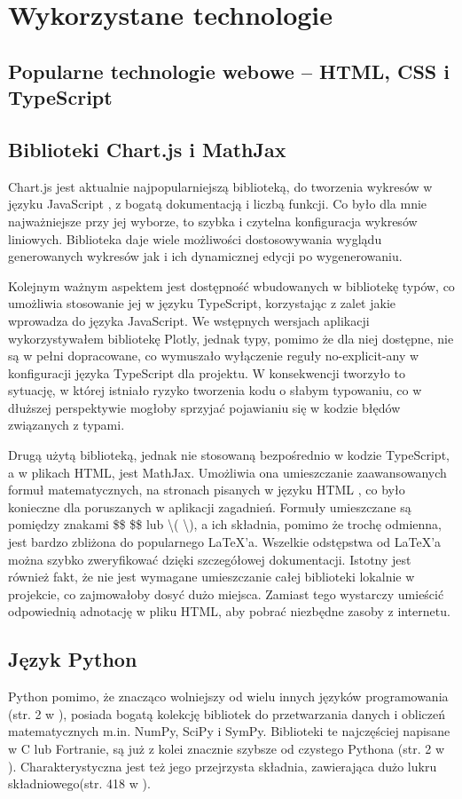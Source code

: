 \documentclass{SGGW-thesis}
\begin{document}
	
\chapter{Wykorzystane technologie}
	\section{Popularne technologie webowe -- HTML, CSS i TypeScript}
	
	\section{Biblioteki Chart.js i MathJax}
	Chart.js jest aktualnie najpopularniejszą biblioteką, do tworzenia wykresów w języku JavaScript \cite{chartjs}, z bogatą dokumentacją i liczbą funkcji. Co było dla mnie najważniejsze przy jej wyborze, to szybka i czytelna konfiguracja wykresów liniowych. Biblioteka daje wiele możliwości dostosowywania wyglądu generowanych wykresów jak i ich dynamicznej edycji po wygenerowaniu.
	
	Kolejnym ważnym aspektem jest dostępność wbudowanych w bibliotekę typów, co umożliwia stosowanie jej w języku TypeScript, korzystając z zalet jakie wprowadza do języka JavaScript. We wstępnych wersjach aplikacji wykorzystywałem bibliotekę Plotly, jednak typy, pomimo że dla niej dostępne, nie są w pełni dopracowane, co wymuszało wyłączenie reguły no-explicit-any w konfiguracji języka TypeScript dla projektu. W konsekwencji tworzyło to sytuację, w której istniało ryzyko tworzenia kodu o słabym typowaniu, co w dłuższej perspektywie mogłoby sprzyjać pojawianiu się w kodzie błędów związanych z typami.
	
	Drugą użytą biblioteką, jednak nie stosowaną bezpośrednio w kodzie TypeScript, a w plikach HTML, jest MathJax. Umożliwia ona umieszczanie zaawansowanych formuł matematycznych, na stronach pisanych w języku HTML \cite{mathjax}, co było konieczne dla poruszanych w aplikacji zagadnień. Formuły umieszczane są pomiędzy znakami \$\$ \$\$ lub \textbackslash( \textbackslash), a ich składnia, pomimo że trochę odmienna, jest bardzo zbliżona do popularnego LaTeX'a. Wszelkie odstępstwa od LaTeX'a można szybko zweryfikować dzięki szczegółowej dokumentacji. Istotny jest również fakt, że nie jest wymagane umieszczanie całej biblioteki lokalnie w projekcie, co zajmowałoby dosyć dużo miejsca. Zamiast tego wystarczy umieścić odpowiednią adnotację w pliku HTML, aby pobrać niezbędne zasoby z internetu.
	
	\section{Język Python}
	Python pomimo, że znacząco wolniejszy od wielu innych języków programowania (str. 2 w  \cite{Python}), posiada bogatą kolekcję bibliotek do przetwarzania danych i obliczeń matematycznych m.in. NumPy, SciPy i SymPy. Biblioteki te najczęściej napisane w C lub Fortranie, są już z kolei znacznie szybsze od czystego Pythona (str. 2 w \cite{Python}). Charakterystyczna jest też jego przejrzysta składnia, zawierająca dużo lukru składniowego(str. 418 w \cite{Python}).
	
\end{document}
